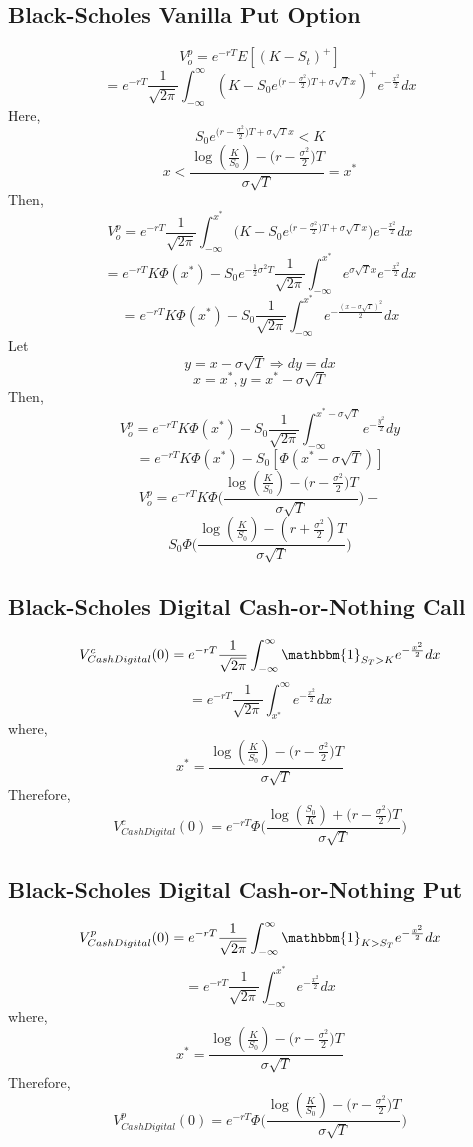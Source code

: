 \documentclass[fleqn,12pt]{SelfArx}
\begin{document}
\subsection{Black-Scholes Vanilla Put Option}
$$
V_o^{p} = e^{-rT}{E}[(K-S_t)^{+}]
$$$$
= e^{-rT}\frac{1}{\sqrt{2\pi}}\int_{-\infty}^{\infty}(K-S_0e^{\big(r-\frac{\sigma^{2}}{2}\big)T +\sigma\sqrt{T}x})^{+}e^{-\frac{x^{2}}{2}}dx
$$
Here, 
$$S_0e^{\big(r-\frac{\sigma^{2}}{2}\big)T +\sigma\sqrt{T}x} < K$$
$$ 
x < \frac{\log({\frac{K}{S_0}})-\big(r-\frac{\sigma^{2}}{2}\big)T}{\sigma\sqrt{T}} = x^{*}
$$
Then,
$$
V_o^{p} = e^{-rT}\frac{1}{\sqrt{2\pi}}\int_{-\infty}^{x^{*}}\Big(K-S_0e^{\big(r-\frac{\sigma^{2}}{2}\big)T +\sigma\sqrt{T}x}\Big)e^{-\frac{x^{2}}{2}}dx
$$$$
=e^{-rT}K\Phi(x^{*})-S_0e^{-\frac{1}{2}\sigma^{2}T}\frac{1}{\sqrt{2\pi}}\int_{-\infty}^{x^{*}}e^{\sigma\sqrt{T}x}e^{-\frac{x^{2}}{2}}dx
$$$$
=e^{-rT}K\Phi(x^{*})-S_0\frac{1}{\sqrt{2\pi}}\int_{-\infty}^{x^{*}}e^{-\frac{(x-\sigma\sqrt{T})^{2}}{2}}dx
$$
Let 
$$y = x-\sigma\sqrt{T} \Rightarrow dy=dx$$
$$x = x^{*}, y = x^{*}-\sigma\sqrt{T}$$
Then,
$$
V_o^{p} = e^{-rT}K\Phi(x^{*}) - S_0\frac{1}{\sqrt{2\pi}}\int_{-\infty}^{x^{*}-\sigma\sqrt{T}}e^{-\frac{y^{2}}{2}}dy
$$$$
= e^{-rT}K\Phi(x^{*}) - S_0[\Phi(x^{*}-\sigma\sqrt{T})]
$$$$
V_o^{p} = e^{-rT}K\Phi\Bigg(\frac{\log({\frac{K}{S_0}})-\big(r-\frac{\sigma^{2}}{2}\big)T}{\sigma\sqrt{T}}\Bigg) -
$$$$
S_0\Phi\Bigg(\frac{\log({\frac{K}{S_0}})-(r+\frac{\sigma^{2}}{2})T}{\sigma\sqrt{T}}\Bigg)
$$

\subsection{Black-Scholes Digital Cash-or-Nothing Call}
$$
V^{c}_{Cash Digital}(0) = e^{-rT}\frac{1}{\sqrt{2\pi}}\int_{-\infty}^{\infty}\mathbbm{1}_{S_T>K}e^{-\frac{x^{2}}{2}}dx
$$
$$
= e^{-rT}\frac{1}{\sqrt{2\pi}}\int_{x^{*}}^{\infty}e^{-\frac{x^{2}}{2}}dx
$$
where,
$$
x^{*} = \frac{\log({\frac{K}{S_0}})-\big(r-\frac{\sigma^{2}}{2}\big)T}{\sigma\sqrt{T}} 
$$
Therefore,
$$
V^{c}_{Cash Digital}(0) = e^{-rT}\Phi\Bigg(\frac{\log({\frac{S_0}{K}})+\big(r-\frac{\sigma^{2}}{2}\big)T}{\sigma\sqrt{T}} \Bigg)
$$

\subsection{Black-Scholes Digital Cash-or-Nothing Put}
$$
V^{p}_{Cash Digital}(0) = e^{-rT}\frac{1}{\sqrt{2\pi}}\int_{-\infty}^{\infty}\mathbbm{1}_{K>S_T}e^{-\frac{x^{2}}{2}}dx
$$
$$
= e^{-rT}\frac{1}{\sqrt{2\pi}}\int_{-\infty}^{x^{*}}e^{-\frac{x^{2}}{2}}dx
$$
where,
$$
x^{*} = \frac{\log({\frac{K}{S_0}})-\big(r-\frac{\sigma^{2}}{2}\big)T}{\sigma\sqrt{T}} 
$$
Therefore,
$$
V^{p}_{Cash Digital}(0) = e^{-rT}\Phi\Bigg(\frac{\log({\frac{K}{S_0}})-\big(r-\frac{\sigma^{2}}{2}\big)T}{\sigma\sqrt{T}} \Bigg)
$$
\end{document}
